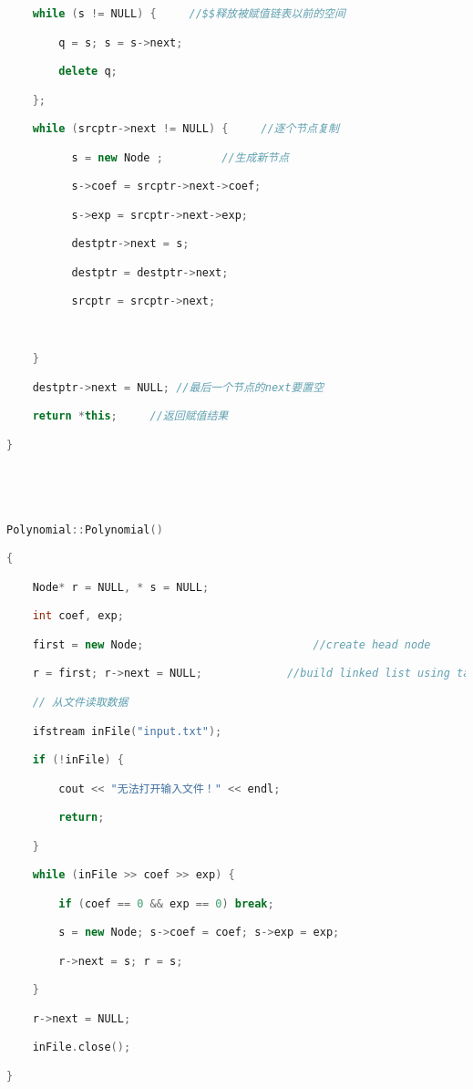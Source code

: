 \begin{lstlisting}[language=C++]
    while (s != NULL) {     //$$释放被赋值链表以前的空间

        q = s; s = s->next;

        delete q;

    };

    while (srcptr->next != NULL) {     //逐个节点复制

          s = new Node ;         //生成新节点

          s->coef = srcptr->next->coef;

          s->exp = srcptr->next->exp;

          destptr->next = s;

          destptr = destptr->next;

          srcptr = srcptr->next;

  

    }

    destptr->next = NULL; //最后一个节点的next要置空  

    return *this;     //返回赋值结果

}

  
  
  

Polynomial::Polynomial()

{

    Node* r = NULL, * s = NULL;

    int coef, exp;

    first = new Node;                          //create head node

    r = first; r->next = NULL;             //build linked list using tail insertion

    // 从文件读取数据

    ifstream inFile("input.txt");

    if (!inFile) {

        cout << "无法打开输入文件！" << endl;

        return;

    }

    while (inFile >> coef >> exp) {

        if (coef == 0 && exp == 0) break;

        s = new Node; s->coef = coef; s->exp = exp;

        r->next = s; r = s;

    }

    r->next = NULL;

    inFile.close();

}


\end{lstlisting}
